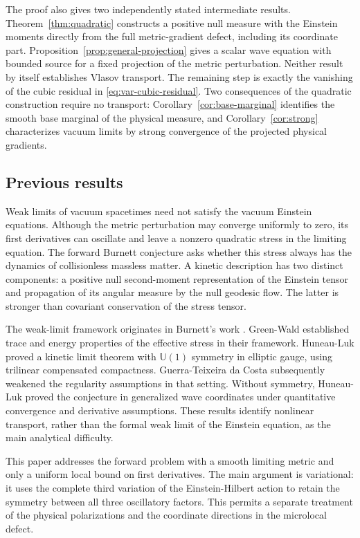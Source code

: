 \documentclass[11pt,a4paper]{article}
\numberwithin{equation}{section}
\theoremstyle{definition}
\begin{document}
The proof also gives two independently stated intermediate results.
Theorem~\ref{thm:quadratic} constructs a positive null measure with the
Einstein moments directly from the full metric-gradient defect, including
its coordinate part. Proposition~\ref{prop:general-projection} gives a
scalar wave equation with bounded source for a fixed projection of the
metric perturbation. Neither result by itself establishes Vlasov
transport. The remaining step is exactly the vanishing of the cubic
residual in \eqref{eq:var-cubic-residual}.
Two consequences of the quadratic construction require no transport:
Corollary~\ref{cor:base-marginal} identifies the smooth base marginal
of the physical measure, and Corollary~\ref{cor:strong} characterizes
vacuum limits by strong convergence of the projected physical gradients.

\subsection{Previous results}

Weak limits of vacuum spacetimes need not satisfy the vacuum Einstein
equations. Although the metric perturbation may converge uniformly to
zero, its first derivatives can oscillate and leave a nonzero quadratic
stress in the limiting equation. The forward Burnett conjecture asks
whether this stress always has the dynamics of collisionless massless
matter. A kinetic description has two distinct components: a positive
null second-moment representation of the Einstein tensor and propagation
of its angular measure by the null geodesic flow. The latter is stronger
than covariant conservation of the stress tensor.

The weak-limit framework originates in Burnett's work
\cite{Burnett1989}. Green-Wald \cite{GW2011} established trace and energy
properties of the effective stress in their framework. Huneau-Luk
\cite{HLelliptic} proved a kinetic limit theorem with $\mathbb U(1)$
symmetry in elliptic gauge, using trilinear compensated compactness.
Guerra-Teixeira da Costa \cite{GTC} subsequently weakened the regularity
assumptions in that setting. Without symmetry, Huneau-Luk
\cite{HLwave} proved the conjecture in generalized wave coordinates under
quantitative convergence and derivative assumptions. These results identify
nonlinear transport, rather than the formal weak limit of the Einstein
equation, as the main analytical difficulty.

This paper addresses the forward problem with a smooth limiting metric
and only a uniform local bound on first derivatives. The main argument
is variational: it uses the complete third variation of the
Einstein-Hilbert action to retain the symmetry between all three
oscillatory factors. This permits a separate treatment of the physical
polarizations and the coordinate directions in the microlocal defect.
\end{document}
